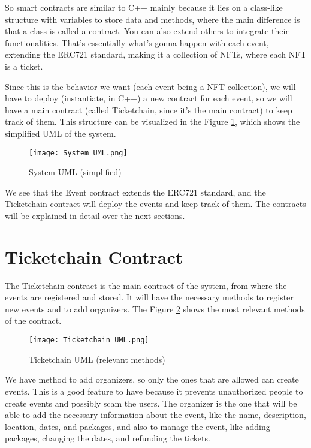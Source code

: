 So smart contracts are similar to C++ mainly because it lies on a class-like
structure with variables to store data and methods, where the main difference
is that a class is called a contract. You can also extend others to integrate
their functionalities. That's essentially what's gonna happen with each event,
extending the ERC721 standard, making it a collection of NFTs, where each NFT
is a ticket.

Since this is the behavior we want (each event being a NFT collection), we will
have to deploy (instantiate, in C++) a new contract for each event, so we will
have a main contract (called Ticketchain, since it's the main contract) to keep
track of them. This structure can be visualized in the Figure
\ref{fig:system_uml}, which shows the simplified UML of the system.

\begin{figure}[H]
	\texttt{[image: System UML.png]}
	\centering
	\caption{System UML (simplified)}
	\label{fig:system_uml}
\end{figure}

We see that the Event contract extends the ERC721 standard, and the Ticketchain
contract will deploy the events and keep track of them. The contracts will be
explained in detail over the next sections.

\section{Ticketchain Contract}
\label{sec:ticketchain_contract}

The Ticketchain contract is the main contract of the system, from where the
events are registered and stored. It will have the necessary methods to
register new events and to add organizers. The Figure \ref{fig:ticketchain_uml}
shows the most relevant methods of the contract.

\begin{figure}[H]
	\texttt{[image: Ticketchain UML.png]}
	\centering
	\caption{Ticketchain UML (relevant methods)}
	\label{fig:ticketchain_uml}
\end{figure}

We have method to add organizers, so only the ones that are allowed can create
events. This is a good feature to have because it prevents unauthorized people
to create events and possibly scam the users. The organizer is the one that
will be able to add the necessary information about the event, like the name,
description, location, dates, and packages, and also to manage the event, like
adding packages, changing the dates, and refunding the tickets.

